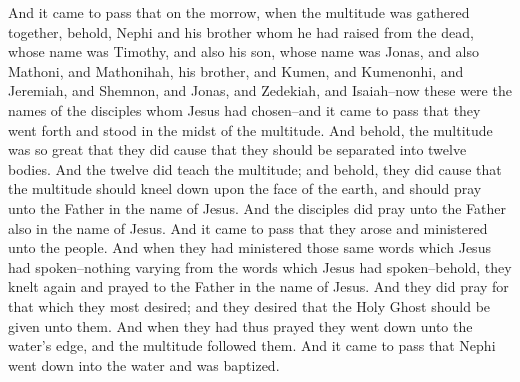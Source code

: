 And it came to pass that on the morrow, when the multitude was gathered together, behold, Nephi and his brother whom he had raised from the dead, whose name was Timothy, and also his son, whose name was Jonas, and also Mathoni, and Mathonihah, his brother, and Kumen, and Kumenonhi, and Jeremiah, and Shemnon, and Jonas, and Zedekiah, and Isaiah--now these were the names of the disciples whom Jesus had chosen--and it came to pass that they went forth and stood in the midst of the multitude.
\bverse \iffalse And behold, the multitude was so great that they did cause that they should be separated into twelve bodies. \fi
And behold, the multitude was so great that they did cause that they should be separated into twelve bodies.
\bverse \iffalse And the twelve did teach the multitude; and behold, they did cause that the multitude should kneel down upon the face of the earth, and should pray unto the Father in the name of Jesus. \fi
And the twelve did teach the multitude; and behold, they did cause that the multitude should kneel down upon the face of the earth, and should pray unto the Father in the name of Jesus.
\bverse \iffalse And the disciples did pray unto the Father also in the name of Jesus. And it came to pass that they arose and ministered unto the people. \fi
And the disciples did pray unto the Father also in the name of Jesus. And it came to pass that they arose and ministered unto the people.
\bverse \iffalse And when they had ministered those same words which Jesus had spoken--nothing varying from the words which Jesus had spoken--behold, they knelt again and prayed to the Father in the name of Jesus. \fi
And when they had ministered those same words which Jesus had spoken--nothing varying from the words which Jesus had spoken--behold, they knelt again and prayed to the Father in the name of Jesus.
\bverse \iffalse And they did pray for that which they most desired; and they desired that the Holy Ghost should be given unto them. \fi
And they did pray for that which they most desired; and they desired that the Holy Ghost should be given unto them.
\bverse \iffalse And when they had thus prayed they went down unto the water's edge, and the multitude followed them. \fi
And when they had thus prayed they went down unto the water's edge, and the multitude followed them.
\bverse \iffalse And it came to pass that Nephi went down into the water and was baptized. \fi
And it came to pass that Nephi went down into the water and was baptized.
\bverse \iffalse And he came up out of the water and began to baptize. And he baptized all those whom Jesus had chosen. \fi
